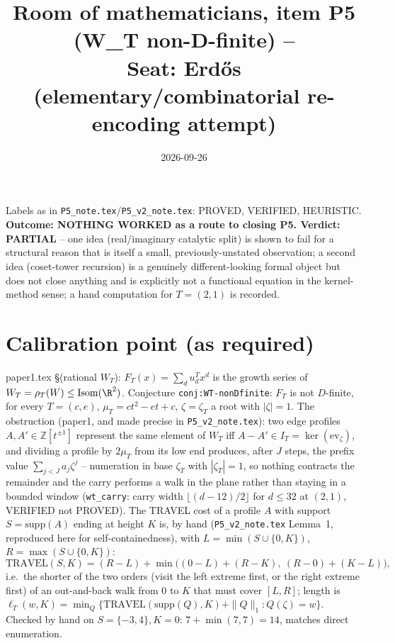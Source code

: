 \documentclass[11pt]{article}
\title{Room of mathematicians, item P5 (W\_T non-D-finite) --\\
Seat: Erd\H{o}s (elementary/combinatorial re-encoding attempt)}
\date{2026-09-26}
\newcommand{\Z}{\mathbb Z}
\begin{document}
\maketitle

Labels as in \texttt{P5\_note.tex}/\texttt{P5\_v2\_note.tex}: PROVED, VERIFIED, HEURISTIC.
\textbf{Outcome: NOTHING WORKED as a route to closing P5. Verdict: PARTIAL} --
one idea (real/imaginary catalytic split) is shown to fail for a structural reason that is
itself a small, previously-unstated observation; a second idea (coset-tower recursion) is a
genuinely different-looking formal object but does not close anything and is explicitly not a
functional equation in the kernel-method sense; a hand computation for $T=(2,1)$ is recorded.

\section*{Calibration point (as required)}

paper1.tex \S(rational $W_T$): $F_T(x)=\sum_d u_d^Tx^d$ is the growth series of
$W_T=\rho_T(W)\le\mathrm{Isom}(\R^2)$. Conjecture \texttt{conj:WT-nonDfinite}: $F_T$ is not
$D$-finite, for every $T=(c,e)$, $\mu_T=ct^2-et+c$, $\zeta=\zeta_T$ a root with $|\zeta|=1$. The
obstruction (paper1, and made precise in \texttt{P5\_v2\_note.tex}): two edge profiles
$A,A'\in\Z[t^{\pm1}]$ represent the same element of $W_T$ iff $A-A'\in I_T=\ker(\mathrm{ev}_\zeta)$,
and dividing a profile by $2\mu_T$ from its low end produces, after $J$ steps, the prefix value
$\sum_{j<J}a_jζ^j$ -- numeration in base $\zeta_T$ with $|\zeta_T|=1$, so nothing contracts the
remainder and the carry performs a walk in the plane rather than staying in a bounded window
(\texttt{wt\_carry}: carry width $\lfloor(d-12)/2\rfloor$ for $d\le32$ at $(2,1)$, VERIFIED not
PROVED). The TRAVEL cost of a profile $A$ with support $S=\mathrm{supp}(A)$ ending at height $K$
is, by hand (\texttt{P5\_v2\_note.tex} Lemma~1, reproduced here for self-containedness), with
$L=\min(S\cup\{0,K\})$, $R=\max(S\cup\{0,K\})$:
\[
\mathrm{TRAVEL}(S,K)=(R-L)+\min\bigl((0-L)+(R-K),\ (R-0)+(K-L)\bigr),
\]
i.e.\ the shorter of the two orders (visit the left extreme first, or the right extreme first) of
an out-and-back walk from $0$ to $K$ that must cover $[L,R]$; length is $\ell_T(w,K)=\min_Q
\{\mathrm{TRAVEL}(\mathrm{supp}(Q),K)+\|Q\|_1: Q(\zeta)=w\}$. Checked by hand on
$S=\{-3,4\},K=0$: $7+\min(7,7)=14$, matches direct enumeration.
\end{document}
